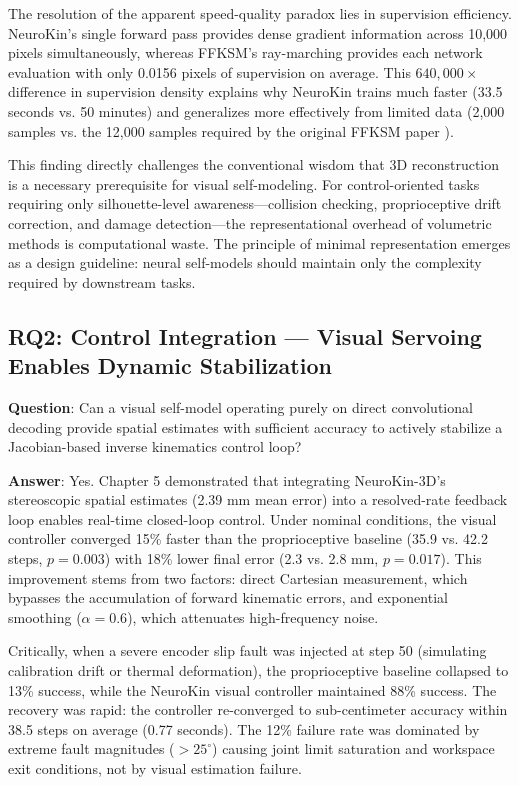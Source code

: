 \documentclass[12pt,a4paper,oneside]{report}
\begin{document}
The resolution of the apparent speed-quality paradox lies in supervision efficiency. NeuroKin's single forward pass provides dense gradient information across 10,000 pixels simultaneously, whereas FFKSM's ray-marching provides each network evaluation with only 0.0156 pixels of supervision on average. This $640,000\times$ difference in supervision density explains why NeuroKin trains much faster (33.5 seconds vs. 50 minutes) and generalizes more effectively from limited data (2,000 samples vs. the 12,000 samples required by the original FFKSM paper \cite{hu2024teaching}).

This finding directly challenges the conventional wisdom that 3D reconstruction is a necessary prerequisite for visual self-modeling. For control-oriented tasks requiring only silhouette-level awareness---collision checking, proprioceptive drift correction, and damage detection---the representational overhead of volumetric methods is computational waste. The principle of minimal representation emerges as a design guideline: neural self-models should maintain only the complexity required by downstream tasks.

\subsection{RQ2: Control Integration --- Visual Servoing Enables Dynamic Stabilization}

\textbf{Question}: Can a visual self-model operating purely on direct convolutional decoding provide spatial estimates with sufficient accuracy to actively stabilize a Jacobian-based inverse kinematics control loop?

\textbf{Answer}: Yes. Chapter 5 demonstrated that integrating NeuroKin-3D's stereoscopic spatial estimates (2.39 mm mean error) into a resolved-rate feedback loop enables real-time closed-loop control. Under nominal conditions, the visual controller converged 15\% faster than the proprioceptive baseline (35.9 vs. 42.2 steps, $p = 0.003$) with 18\% lower final error (2.3 vs. 2.8 mm, $p = 0.017$). This improvement stems from two factors: direct Cartesian measurement, which bypasses the accumulation of forward kinematic errors, and exponential smoothing ($\alpha = 0.6$), which attenuates high-frequency noise.

Critically, when a severe encoder slip fault was injected at step 50 (simulating calibration drift or thermal deformation), the proprioceptive baseline collapsed to 13\% success, while the NeuroKin visual controller maintained 88\% success. The recovery was rapid: the controller re-converged to sub-centimeter accuracy within 38.5 steps on average (0.77 seconds). The 12\% failure rate was dominated by extreme fault magnitudes ($>25^\circ$) causing joint limit saturation and workspace exit conditions, not by visual estimation failure.
\end{document}
